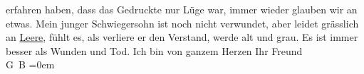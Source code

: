 \begin{ledgroupsized}[t]{13cm}
               erfahren haben, dass das Gedruckte {\pb}nur Lüge war, immer wieder glauben wir an etwas.\pend
           \pstart
           Mein junger Schwiegersohn ist
               noch nicht verwundet, aber leidet grässlich an \uline{Leere},
               fühlt es, als verliere er den Verstand, werde alt und grau. Es ist immer besser als
               Wunden und Tod.\pend
           \pstart
           Ich bin von ganzem Herzen Ihr Freund{\\[\baselineskip]}\spacefill\mbox{G B}\pend
           \leftskip=0em{}\endnumbering{}\end{ledgroupsized}  \newcommand{\dateiname}{L02223}\newcommand{\titel}{Georg Brandes an Arthur Schnitzler, 13. 12. 1915}\newcommand{\editorInnen}{Martin Anton Müller und Gerd-Hermann Susen}
      